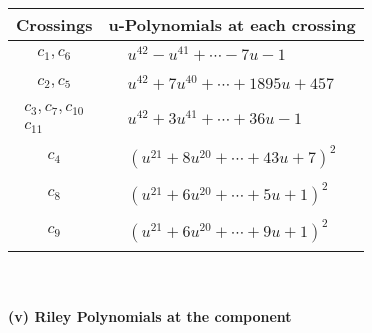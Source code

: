 \documentclass[1p]{elsarticle_modified}
\theoremstyle{definition}
\begin{document}
\begin{tabular}{m{50pt}|m{274pt}}
Crossings & \hspace{64pt}u-Polynomials at each crossing \\
\hline $$\begin{aligned}c_{1},c_{6}\end{aligned}$$&$\begin{aligned}
&u^{42}- u^{41}+\cdots-7 u-1
\end{aligned}$\\
\hline $$\begin{aligned}c_{2},c_{5}\end{aligned}$$&$\begin{aligned}
&u^{42}+7 u^{40}+\cdots+1895 u+457
\end{aligned}$\\
\hline $$\begin{aligned}c_{3},c_{7},c_{10}\\c_{11}\end{aligned}$$&$\begin{aligned}
&u^{42}+3 u^{41}+\cdots+36 u-1
\end{aligned}$\\
\hline $$\begin{aligned}c_{4}\end{aligned}$$&$\begin{aligned}
&(u^{21}+8 u^{20}+\cdots+43 u+7)^{2}
\end{aligned}$\\
\hline $$\begin{aligned}c_{8}\end{aligned}$$&$\begin{aligned}
&(u^{21}+6 u^{20}+\cdots+5 u+1)^{2}
\end{aligned}$\\
\hline $$\begin{aligned}c_{9}\end{aligned}$$&$\begin{aligned}
&(u^{21}+6 u^{20}+\cdots+9 u+1)^{2}
\end{aligned}$\\
\hline
\end{tabular}\\~\\
\newpage\renewcommand{\arraystretch}{1}
\flushleft \textbf{(v) Riley Polynomials at the component}\newline \\
\end{document}
